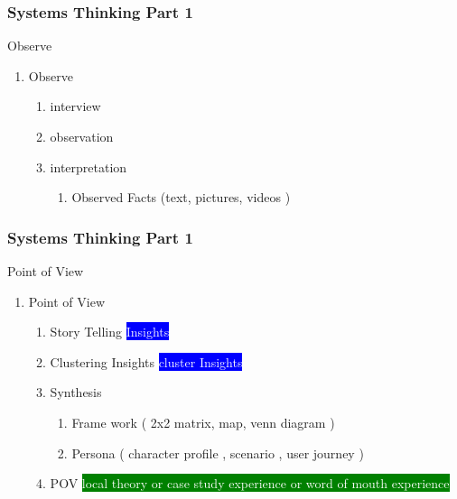 \newpage
\begin{frame}
\frametitle{ Systems Thinking  Part 1 }
\begin{block}{ Observe }

\begin{enumerate}[2]

    \item Observe
     \begin{enumerate}
         \item interview
         \item observation
         \item interpretation 
         \begin{enumerate}
             \item Observed Facts (text, pictures, videos ) 
         \end{enumerate}
     \end{enumerate}
 
\end{enumerate}

\end{block}
\end{frame}




\newpage
\begin{frame}
\frametitle{Systems Thinking  Part 1 }
\begin{block}{ Point of View }

\begin{enumerate}[3]

    \item  Point of View
     \begin{enumerate}
         \item Story Telling  \colorbox{blue}{ \textcolor{white}{  Insights } }
         \item Clustering Insights  \colorbox{blue}{ \textcolor{white}{  cluster Insights } }
         \item Synthesis
                       \begin{enumerate}
                           \item Frame work  ( 2x2 matrix, map, venn diagram )
                           \item Persona  ( character profile ,  scenario , user journey )
                       \end{enumerate}
         
         \item POV   \colorbox{green}{ \textcolor{white}{ local theory or case study experience or word of mouth experience } }
     \end{enumerate}
 
\end{enumerate}

\end{block}
\end{frame}




